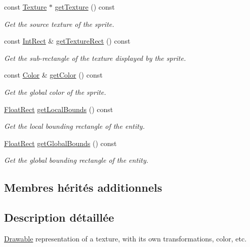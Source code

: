 \begin{DoxyCompactItemize}
const \hyperlink{classsf_1_1Texture}{Texture} $\ast$ \hyperlink{classsf_1_1Sprite_a1a76155146c8ff37c4eb5a306b4e9ebe}{get\+Texture} () const
\begin{DoxyCompactList}\small\item\em Get the source texture of the sprite. \end{DoxyCompactList}\item 
const \hyperlink{classsf_1_1Rect}{Int\+Rect} \& \hyperlink{classsf_1_1Sprite_a3492896fe7b63f58ae022c5b8bec5c98}{get\+Texture\+Rect} () const
\begin{DoxyCompactList}\small\item\em Get the sub-\/rectangle of the texture displayed by the sprite. \end{DoxyCompactList}\item 
const \hyperlink{classsf_1_1Color}{Color} \& \hyperlink{classsf_1_1Sprite_ac5f419f37b4e38f7a94186e3a3e303e1}{get\+Color} () const
\begin{DoxyCompactList}\small\item\em Get the global color of the sprite. \end{DoxyCompactList}\item 
\hyperlink{classsf_1_1Rect}{Float\+Rect} \hyperlink{classsf_1_1Sprite_ab2f4c781464da6f8a52b1df6058a48b8}{get\+Local\+Bounds} () const
\begin{DoxyCompactList}\small\item\em Get the local bounding rectangle of the entity. \end{DoxyCompactList}\item 
\hyperlink{classsf_1_1Rect}{Float\+Rect} \hyperlink{classsf_1_1Sprite_aa795483096b90745b2e799532963e271}{get\+Global\+Bounds} () const
\begin{DoxyCompactList}\small\item\em Get the global bounding rectangle of the entity. \end{DoxyCompactList}\end{DoxyCompactItemize}
\subsection*{Membres hérités additionnels}


\subsection{Description détaillée}
\hyperlink{classsf_1_1Drawable}{Drawable} representation of a texture, with its own transformations, color, etc. 

